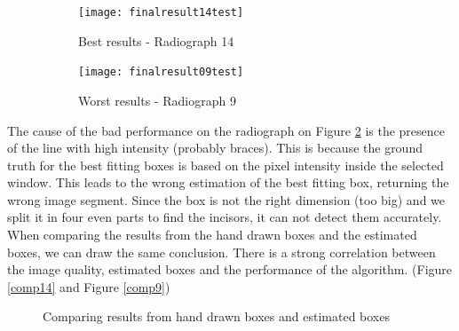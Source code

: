 \documentclass[a4paper]{article}
\begin{document}
\begin{figure}[htp]
    \centering
    \begin{subfigure}[b]{0.45\textwidth}
        \texttt{[image: finalresult14test]}
        \caption{Best results - Radiograph 14}
        \label{fig:bestresult}
    \end{subfigure}
    \begin{subfigure}[b]{0.45\textwidth}
        \texttt{[image: finalresult09test]} 
        \caption{Worst results - Radiograph 9}
        \label{fig:worstresult}
    \end{subfigure}
    \caption{}
    \label{fig:bestandworst}
\end{figure}

The cause of the bad performance on the radiograph on Figure \ref{fig:worstresult} is the presence of the line with high intensity (probably braces). This is because the ground truth for the best fitting boxes is based on the pixel intensity inside the selected window. This leads to the wrong estimation of the best fitting box, returning the wrong image segment. Since the box is not the right dimension (too big) and we split it in four even parts to find the incisors, it can not detect them accurately.\\
When comparing the results from the hand drawn boxes and the estimated boxes, we can draw the same conclusion. There is a strong correlation between the image quality, estimated boxes and the performance of the algorithm. (Figure \ref{comp14} and Figure \ref{comp9})

\begin{figure}[h] 
    \centering
    \par\medskip
    \par\medskip        
    \caption{Comparing results from hand drawn boxes and estimated boxes}
    \label{fig:compareboxes}
\end{figure}
\end{document}
